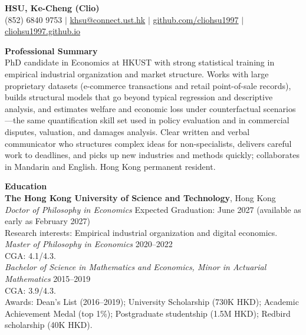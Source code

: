 \documentclass[11pt,letterpaper]{article}
\begin{document}
{\Large \textbf{HSU, Ke-Cheng (Clio)}}\\[1pt]
(852) 6840 9753 \quad $|$ \quad \href{mailto:khsu@connect.ust.hk}{khsu@connect.ust.hk} \quad $|$ \quad \href{https://github.com/cliohsu1997}{github.com/cliohsu1997} \quad $|$ \quad \href{https://cliohsu1997.github.io/}{cliohsu1997.github.io}

\vspace{0.15pt}

{\large \textbf{Professional Summary}}\\[-0.5pt]
PhD candidate in Economics at HKUST with strong statistical training in empirical industrial organization and market structure. Works with large proprietary datasets (e-commerce transactions and retail point-of-sale records), builds structural models that go beyond typical regression and descriptive analysis, and estimates welfare and economic loss under counterfactual scenarios---the same quantification skill set used in policy evaluation and in commercial disputes, valuation, and damages analysis. Clear written and verbal communicator who structures complex ideas for non-specialists, delivers careful work to deadlines, and picks up new industries and methods quickly; collaborates in Mandarin and English. Hong Kong permanent resident.

\vspace{0.15pt}

{\large \textbf{Education}}\\[-0.5pt]
\textbf{The Hong Kong University of Science and Technology}, Hong Kong\\
\textit{Doctor of Philosophy in Economics} \hfill Expected Graduation: June 2027 (available as early as February 2027)\\
Research interests: Empirical industrial organization and digital economics.\\
\textit{Master of Philosophy in Economics} \hfill 2020--2022\\
CGA: 4.1/4.3.\\
\textit{Bachelor of Science in Mathematics and Economics, Minor in Actuarial Mathematics} \hfill 2015--2019\\
CGA: 3.9/4.3.\\
Awards: Dean's List (2016--2019); University Scholarship (730K HKD); Academic Achievement Medal (top 1\%); Postgraduate studentship (1.5M HKD); Redbird scholarship (40K HKD).

\vspace{0.15pt}
\end{document}
